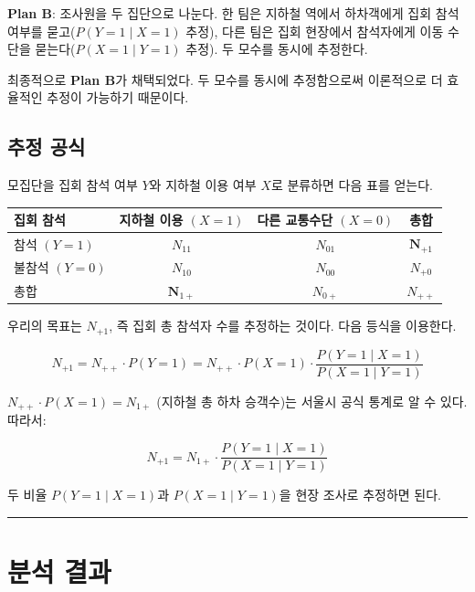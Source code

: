 \documentclass[
  letterpaper,
  DIV=11,
  numbers=noendperiod]{scrreprt}
\newcounter{none} %
\begin{document}
\textbf{Plan B}: 조사원을 두 집단으로 나눈다. 한 팀은 지하철 역에서
하차객에게 집회 참석 여부를 묻고(\(P(Y=1 \mid X=1)\) 추정), 다른 팀은
집회 현장에서 참석자에게 이동 수단을 묻는다(\(P(X=1 \mid Y=1)\) 추정).
두 모수를 동시에 추정한다.

최종적으로 \textbf{Plan B}가 채택되었다. 두 모수를 동시에 추정함으로써
이론적으로 더 효율적인 추정이 가능하기 때문이다.

\subsection{추정 공식}\label{uxcd94uxc815-uxacf5uxc2dd}

모집단을 집회 참석 여부 \(Y\)와 지하철 이용 여부 \(X\)로 분류하면 다음
표를 얻는다.

{\def\LTcaptype{none} %
\begin{longtable}[]{@{}lccc@{}}
\toprule\noalign{}
집회 참석 & 지하철 이용 \((X=1)\) & 다른 교통수단 \((X=0)\) & 총합 \\
\midrule\noalign{}
\endhead
\bottomrule\noalign{}
\endlastfoot
참석 \((Y=1)\) & \(N_{11}\) & \(N_{01}\) & \(\textbf{N}_{+1}\) \\
불참석 \((Y=0)\) & \(N_{10}\) & \(N_{00}\) & \(N_{+0}\) \\
총합 & \(\textbf{N}_{1+}\) & \(N_{0+}\) & \(N_{++}\) \\
\end{longtable}
}

우리의 목표는 \(N_{+1}\), 즉 집회 총 참석자 수를 추정하는 것이다. 다음
등식을 이용한다.

\[N_{+1} = N_{++} \cdot P(Y=1) = N_{++} \cdot P(X=1) \cdot \frac{P(Y=1 \mid X=1)}{P(X=1 \mid Y=1)}\]

\(N_{++} \cdot P(X=1) = N_{1+}\) (지하철 총 하차 승객수)는 서울시 공식
통계로 알 수 있다. 따라서:

\[\boxed{N_{+1} = N_{1+} \cdot \frac{P(Y=1 \mid X=1)}{P(X=1 \mid Y=1)}}\]

두 비율 \(P(Y=1 \mid X=1)\)과 \(P(X=1 \mid Y=1)\)을 현장 조사로 추정하면
된다.

\begin{center}\rule{0.5\linewidth}{0.5pt}\end{center}

\section{분석 결과}\label{uxbd84uxc11d-uxacb0uxacfc}
\end{document}
